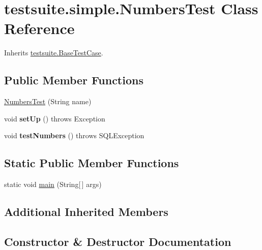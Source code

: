 \hypertarget{classtestsuite_1_1simple_1_1_numbers_test}{}\section{testsuite.\+simple.\+Numbers\+Test Class Reference}
\label{classtestsuite_1_1simple_1_1_numbers_test}


Inherits \mbox{\hyperlink{classtestsuite_1_1_base_test_case}{testsuite.\+Base\+Test\+Case}}.

\subsection*{Public Member Functions}
\begin{DoxyCompactItemize}
\item 
\mbox{\hyperlink{classtestsuite_1_1simple_1_1_numbers_test_adad110f92c704d82cdbaa52ed9626573}{Numbers\+Test}} (String name)
\item 
\mbox{\label{classtestsuite_1_1simple_1_1_numbers_test_a6cdec77fd619aab7060428194f75d50b}} 
void {\bfseries set\+Up} ()  throws Exception 
\item 
\mbox{\label{classtestsuite_1_1simple_1_1_numbers_test_aecceecbd6a68dcd409c3553f1a0e210e}} 
void {\bfseries test\+Numbers} ()  throws S\+Q\+L\+Exception 
\end{DoxyCompactItemize}
\subsection*{Static Public Member Functions}
\begin{DoxyCompactItemize}
\item 
static void \mbox{\hyperlink{classtestsuite_1_1simple_1_1_numbers_test_a71ce4bec6ea91a72a2818b53e626d99b}{main}} (String\mbox{[}$\,$\mbox{]} args)
\end{DoxyCompactItemize}
\subsection*{Additional Inherited Members}


\subsection{Constructor \& Destructor Documentation}
\mbox{\label{classtestsuite_1_1simple_1_1_numbers_test_adad110f92c704d82cdbaa52ed9626573}} 

